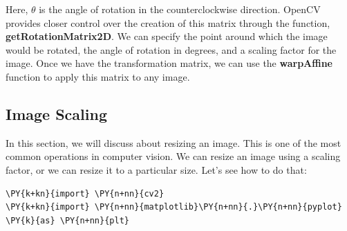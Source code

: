 Here, $\theta$ is the angle of rotation in the counterclockwise direction. OpenCV provides closer control over the creation of this matrix through the function, \textbf{getRotationMatrix2D}. We can specify the point around which the image would be rotated, the angle of rotation in degrees, and a scaling factor for the image. Once we have the transformation matrix, we can use the \textbf{warpAffine} function to apply this matrix to any image.

\subsection{Image Scaling}
In this section, we will discuss about resizing an image. This is one of the most common operations in computer 	vision. We can resize an image using a scaling factor, or we can resize it to a particular size. Let's see how to do that:

\vspace{0.5cm}

\begin{tcolorbox}[breakable, size=fbox, boxrule=1pt, pad at break*=1mm,colback=cellbackground, colframe=cellborder]
	\begin{Verbatim}[commandchars=\\\{\}]
\PY{k+kn}{import} \PY{n+nn}{cv2}
\PY{k+kn}{import} \PY{n+nn}{matplotlib}\PY{n+nn}{.}\PY{n+nn}{pyplot} \PY{k}{as} \PY{n+nn}{plt}
	\end{Verbatim}
\end{tcolorbox}


